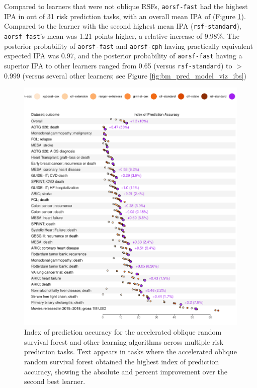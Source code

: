 \documentclass[twoside,11pt]{article}\usepackage[]{graphicx}\usepackage[]{xcolor}
\makeatletter
\def\maxwidth{ %
  \ifdim\Gin@nat@width>\linewidth
    \linewidth
  \else
    \Gin@nat@width
  \fi
}
\newenvironment{knitrout}{}{} %
\makeatother
\begin{document}
Compared to learners that were not oblique RSFs, \texttt{aorsf-fast} had the highest IPA in  out of 31 risk prediction tasks, with an overall mean IPA of  (Figure \ref{fig:bm_pred_viz_ibs}). Compared to the learner with the second highest mean IPA (\texttt{rsf-standard}), \texttt{aorsf-fast}'s mean was 1.21 points higher, a relative increase of 9.98\%. The posterior probability of \texttt{aorsf-fast} and \texttt{aorsf-cph} having practically equivalent expected IPA was 0.97, and the posterior probability of \texttt{aorsf-fast} having a superior IPA to other learners ranged from 0.65 (versus \texttt{rsf-standard}) to $>$0.999 (versus several other learners; see Figure \ref{fig:bm_pred_model_viz_ibs})

\begin{knitrout}
\color{fgcolor}\begin{figure}
\includegraphics[width=\maxwidth]{figure/bm_pred_viz_ibs-1} \caption[Index of prediction accuracy for the accelerated oblique random survival forest and other learning algorithms across multiple risk prediction tasks]{Index of prediction accuracy for the accelerated oblique random survival forest and other learning algorithms across multiple risk prediction tasks. Text appears in tasks where the accelerated oblique random survival forest obtained the highest index of prediction accuracy, showing the absolute and percent improvement over the second best learner.}\label{fig:bm_pred_viz_ibs}
\end{figure}

\end{knitrout}
\end{document}
